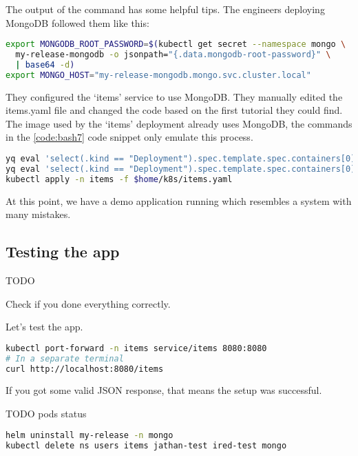 The output of the command has some helpful tips. The engineers deploying MongoDB followed them like this:

\begin{lstlisting}[caption={Create first deployment},language=bash,label=code:bash6]
export MONGODB_ROOT_PASSWORD=$(kubectl get secret --namespace mongo \
  my-release-mongodb -o jsonpath="{.data.mongodb-root-password}" \
  | base64 -d)
export MONGO_HOST="my-release-mongodb.mongo.svc.cluster.local"
\end{lstlisting}

They configured the `items' service to use MongoDB. They manually edited the items.yaml file and changed the code based on the first tutorial they could find. The image used by the `items' deployment already uses MongoDB, the commands in the \ref{code:bash7} code snippet only emulate this process.

\begin{lstlisting}[caption={Configure the `items' app to use MongoDB},language=bash,label=code:bash7]
yq eval 'select(.kind == "Deployment").spec.template.spec.containers[0].env[0].value = env(MONGODB_ROOT_PASSWORD)' $home/k8s/items.yaml -i
yq eval 'select(.kind == "Deployment").spec.template.spec.containers[0].env[1].value = env(MONGO_HOST)' $home/k8s/items.yaml -i
kubectl apply -n items -f $home/k8s/items.yaml
\end{lstlisting}

At this point, we have a demo application running which resembles a system with many mistakes.

\subsection{Testing the app}

TODO

Check if you done everything correctly.

Let's test the app.

\begin{lstlisting}[caption={TODO},language=bash,label=code:bash8]
kubectl port-forward -n items service/items 8080:8080
# In a separate terminal
curl http://localhost:8080/items
\end{lstlisting}

If you got some valid JSON response, that means the setup was successful.

TODO pods status

\begin{lstlisting}[caption={Teardown},language=bash,label=code:bash9]
helm uninstall my-release -n mongo
kubectl delete ns users items jathan-test ired-test mongo
\end{lstlisting}

